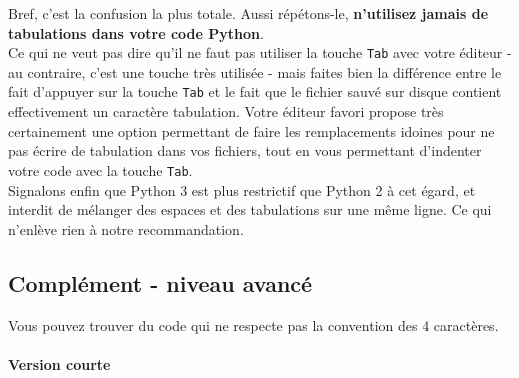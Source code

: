     \begin{Shaded}
\begin{Highlighting}[]
  
          
\OperatorTok{=} 
            \NormalTok{(}\NormalTok{)}
        \NormalTok{:}
\OperatorTok{=} 
            \NormalTok{(}\NormalTok{)}
\end{Highlighting}
\end{Shaded}

    Bref, c'est la confusion la plus totale. Aussi répétons-le,
\textbf{n'utilisez jamais de tabulations dans votre code Python}.\\

    Ce qui ne veut pas dire qu'il ne faut pas utiliser la touche
\texttt{Tab} avec votre éditeur - au contraire, c'est une touche très
utilisée - mais faites bien la différence entre le fait d'appuyer sur la
touche \texttt{Tab} et le fait que le fichier sauvé sur disque contient
effectivement un caractère tabulation. Votre éditeur favori propose très
certainement une option permettant de faire les remplacements idoines
pour ne pas écrire de tabulation dans vos fichiers, tout en vous
permettant d'indenter votre code avec la touche \texttt{Tab}.\\

    Signalons enfin que Python 3 est plus restrictif que Python 2 à cet
égard, et interdit de mélanger des espaces et des tabulations sur une
même ligne. Ce qui n'enlève rien à notre recommandation.

    \hypertarget{compluxe9ment---niveau-avancuxe9}{%
\subsection{Complément - niveau
avancé}\label{compluxe9ment---niveau-avancuxe9}}

    Vous pouvez trouver du code qui ne respecte pas la convention des 4
caractères.

    \hypertarget{version-courte}{%
\paragraph{Version courte\\\\}\label{version-courte}}


